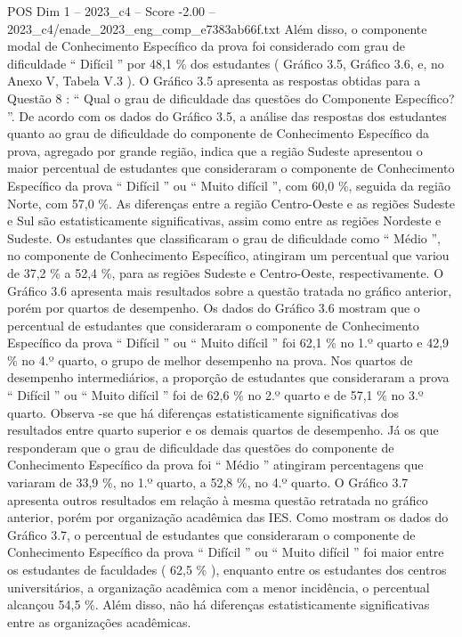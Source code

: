 \begin{textsample}{POS Dim 1 – 2023\_c4 – Score -2.00 – 2023\_c4/enade\_2023\_eng\_comp\_e7383ab66f.txt}
Além disso, o componente modal de Conhecimento Específico da prova foi considerado com grau de dificuldade “ Difícil ” por 48,1 \% dos estudantes ( Gráfico 3.5, Gráfico 3.6, e, no Anexo V, Tabela V.3 ).
O Gráfico 3.5 apresenta as respostas obtidas para a Questão 8 : “ Qual o grau de dificuldade das questões do Componente Específico? ”.
De acordo com os dados do Gráfico 3.5, a análise das respostas dos estudantes quanto ao grau de dificuldade do componente de Conhecimento Específico da prova, agregado por grande região, indica que a região Sudeste apresentou o maior percentual de estudantes que consideraram o componente de Conhecimento Específico da prova “ Difícil ” ou “ Muito difícil ”, com 60,0 \%, seguida da região Norte, com 57,0 \%.
As diferenças entre a região Centro-Oeste e as regiões Sudeste e Sul são estatisticamente significativas, assim como entre as regiões Nordeste e Sudeste.
Os estudantes que classificaram o grau de dificuldade como “ Médio ”, no componente de Conhecimento Específico, atingiram um percentual que variou de 37,2 \% a 52,4 \%, para as regiões Sudeste e Centro-Oeste, respectivamente.
O Gráfico 3.6 apresenta mais resultados sobre a questão tratada no gráfico anterior, porém por quartos de desempenho.
Os dados do Gráfico 3.6 mostram que o percentual de estudantes que consideraram o componente de Conhecimento Específico da prova “ Difícil ” ou “ Muito difícil ” foi 62,1 \% no 1.º quarto e 42,9 \% no 4.º quarto, o grupo de melhor desempenho na prova.
Nos quartos de desempenho intermediários, a proporção de estudantes que consideraram a prova “ Difícil ” ou “ Muito difícil ” foi de 62,6 \% no 2.º quarto e de 57,1 \% no 3.º quarto.
Observa -se que há diferenças estatisticamente significativas dos resultados entre quarto superior e os demais quartos de desempenho.
Já os que responderam que o grau de dificuldade das questões do componente de Conhecimento Específico da prova foi “ Médio ” atingiram percentagens que variaram de 33,9 \%, no 1.º quarto, a 52,8 \%, no 4.º quarto.
O Gráfico 3.7 apresenta outros resultados em relação à mesma questão retratada no gráfico anterior, porém por organização acadêmica das IES.
Como mostram os dados do Gráfico 3.7, o percentual de estudantes que consideraram o componente de Conhecimento Específico da prova “ Difícil ” ou “ Muito difícil ” foi maior entre os estudantes de faculdades ( 62,5 \% ), enquanto entre os estudantes dos centros universitários, a organização acadêmica com a menor incidência, o percentual alcançou 54,5 \%.
Além disso, não há diferenças estatisticamente significativas entre as organizações acadêmicas.

\end{textsample}
